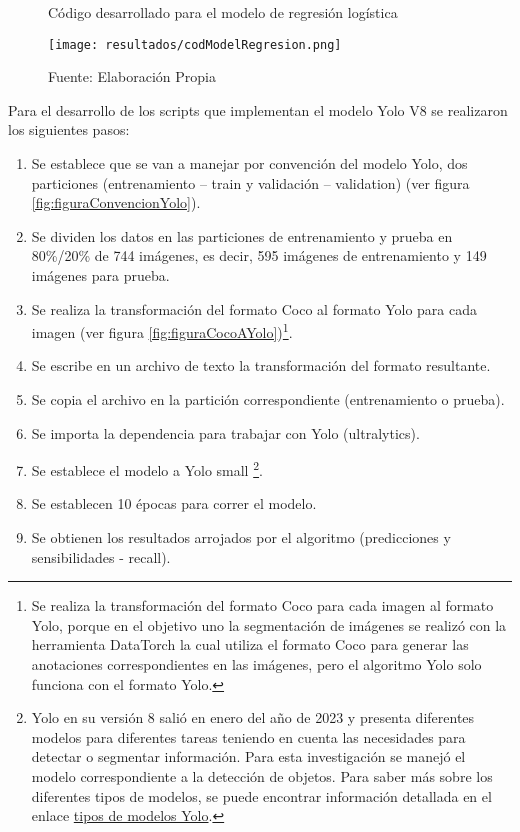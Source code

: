 \newpage

\begin{figure}[h]
\centering
\caption{Código desarrollado para el modelo de regresión logística}
\texttt{[image: resultados/codModelRegresion.png]}
\caption*{\footnotesize Fuente: Elaboración Propia}
\label{fig:figuraCodModelRegresion}
\end{figure}

Para el desarrollo de los scripts que implementan el modelo Yolo V8 se realizaron los siguientes pasos:

\begin{enumerate}
    \item Se establece que se van a manejar por convención del modelo Yolo, dos particiones (entrenamiento – train y validación – validation) (ver figura \ref{fig:figuraConvencionYolo}).
    \item Se dividen los datos en las particiones de entrenamiento y prueba en 80\%/20\% de 744 imágenes, es decir, 595 imágenes de entrenamiento y 149 imágenes para prueba.
    \item Se realiza la transformación del formato Coco al formato Yolo para cada imagen  (ver figura \ref{fig:figuraCocoAYolo})\footnote{Se realiza la transformación del formato Coco para cada imagen al formato Yolo, porque en el objetivo uno la segmentación de imágenes se realizó con la herramienta DataTorch la cual utiliza el formato Coco para generar las anotaciones correspondientes en las imágenes, pero el algoritmo Yolo solo funciona con el formato Yolo.}.
    \item Se escribe en un archivo de texto la transformación del formato resultante.
    \item Se copia el archivo en la partición correspondiente (entrenamiento o prueba).
    \item Se importa la dependencia para trabajar con Yolo (ultralytics).
    \item Se establece el modelo a Yolo small \footnote{Yolo en su versión 8 salió en enero del año de 2023 y presenta diferentes modelos para diferentes tareas teniendo en cuenta las necesidades para detectar o segmentar información. Para esta investigación se manejó el modelo correspondiente a la detección de objetos. Para saber más sobre los diferentes tipos de modelos, se puede encontrar información detallada en el enlace \href{https://docs.ultralytics.com/es/models/yolov8/\#tareas-y-modos-compatibles}{tipos de modelos Yolo}. }. 
    \item Se establecen 10 épocas para correr el modelo.
    \item Se obtienen los resultados arrojados por el algoritmo (predicciones y sensibilidades - recall).
\end{enumerate}

